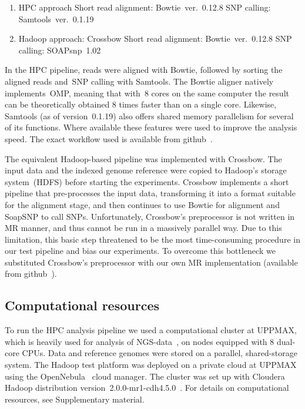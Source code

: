 \documentclass[10pt]{article}
\begin{document}
\begin{enumerate}
\item HPC approach
\subitem Short read alignment: Bowtie~ver.~0.12.8
\subitem SNP calling: Samtools~ver.~0.1.19
\item Hadoop approach: Crossbow
\subitem Short read alignment: Bowtie~ver.~0.12.8
\subitem SNP calling: SOAPsnp~1.02
\end{enumerate}


In the HPC pipeline, reads were aligned with Bowtie, followed by sorting the aligned reads and~SNP calling with Samtools. The Bowtie aligner natively implements~OMP, meaning that with~8 cores on the same computer the result can be theoretically obtained 8 times faster than on a single core. Likewise, Samtools (as of version~0.1.19) also offers shared memory parallelism for several of its functions. Where available these features were used to improve the analysis speed. The exact workflow used is available from github~\cite{code_repo_bash}.

The equivalent Hadoop-based pipeline was implemented with Crossbow. The input data and the indexed genome reference were copied to Hadoop's storage system~(HDFS) before starting the experiments. Crossbow implements a short pipeline that pre-processes the input data, transforming it into a format suitable for the alignment stage, and then continues to use Bowtie for alignment and SoapSNP to call SNPs.  Unfortunately, Crossbow's preprocessor is not written in MR manner, and thus cannot be run in a massively parallel way. Due to this limitation, this basic step threatened to be the most time-consuming procedure in our test pipeline and bias our experiments. To overcome this bottleneck we substituted Crossbow's preprocessor with our own MR implementation (available from github~\cite{code_repo_mr}).



\subsection*{Computational resources}
To run the HPC analysis pipeline we used a computational cluster at UPPMAX, which is heavily used for analysis of NGS-data~\cite{lampa}, on nodes equipped with 8 dual-core CPUs. Data and reference genomes were stored on a parallel, shared-storage system. The Hadoop test platform was deployed on a private cloud at UPPMAX using the OpenNebula~\cite{opennebula} cloud manager. The cluster was set up with Cloudera Hadoop distribution version~2.0.0-mr1-cdh4.5.0~\cite{cloudera}. For details on computational resources, see Supplementary material.
\end{document}
